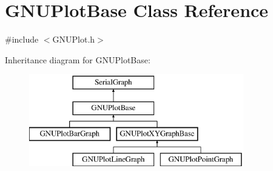 \hypertarget{class_g_n_u_plot_base}{}\section{G\+N\+U\+Plot\+Base Class Reference}
\label{class_g_n_u_plot_base}


{\ttfamily \#include $<$G\+N\+U\+Plot.\+h$>$}

Inheritance diagram for G\+N\+U\+Plot\+Base\+:\begin{figure}[H]
\begin{center}
\leavevmode
\includegraphics[height=4.000000cm]{class_g_n_u_plot_base}
\end{center}
\end{figure}
